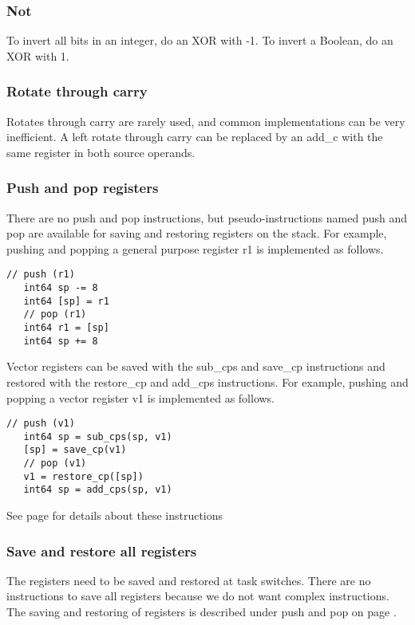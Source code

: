 \documentclass[forwardcom.tex]{subfiles}
\begin{document}
\subsubsection{Not}
To invert all bits in an integer, do an XOR with -1. To invert a Boolean, do an XOR with 1.

\subsubsection{Rotate through carry}
Rotates through carry are rarely used, and common implementations can be very inefficient. A left rotate through carry can be replaced by an add\_c with the same register in both source operands.

\subsubsection{Push and pop registers}
\label{pushPop}
There are no push and pop instructions, but pseudo-instructions named push and pop are available
for saving and restoring registers on the stack. For example, pushing and popping a general purpose register r1 is implemented as follows.

\begin{lstlisting}[frame=single]
   // push (r1)
   int64 sp -= 8
   int64 [sp] = r1
   // pop (r1)
   int64 r1 = [sp]
   int64 sp += 8
\end{lstlisting}

Vector registers can be saved with the sub\_cps and save\_cp instructions and restored with 
the restore\_cp and add\_cps instructions. For example, pushing and popping a vector register v1 is implemented as follows.

\begin{lstlisting}[frame=single]
   // push (v1)
   int64 sp = sub_cps(sp, v1)
   [sp] = save_cp(v1)
   // pop (v1)      
   v1 = restore_cp([sp])
   int64 sp = add_cps(sp, v1)
\end{lstlisting} 

See page \pageref{table:saveCpInstruction} for details about these instructions
\vspace{2mm}


\subsubsection{Save and restore all registers}
The registers need to be saved and restored at task switches. There are no instructions to save all registers because we do not want complex instructions. The saving and restoring of registers is described under push and pop on page \pageref{pushPop}.
\vspace{2mm}
\end{document}
